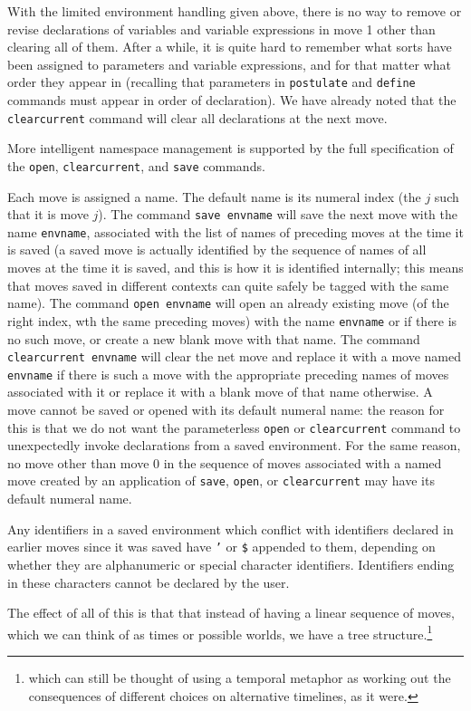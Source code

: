 \documentclass[12pt]{article}
\begin{document}
With the limited environment handling given above, there is no way to remove or revise declarations of variables and variable expressions in move 1 other than clearing all of them.  After a while, it is quite hard to remember what sorts have been assigned to parameters and variable expressions, and for that matter what order they appear in (recalling that parameters in {\tt postulate} and {\tt define} commands must appear in order of declaration).  We have already noted
that the {\tt clearcurrent} command will clear all declarations at the next move.

More intelligent namespace management is supported by the full specification of the {\tt open}, {\tt clearcurrent}, and {\tt save} commands.

Each move is assigned a name.  The default name is its numeral index (the $j$ such that it is move $j$).  The command {\tt save envname} will save the next move with the name
{\tt envname}, associated with the list of names of preceding moves at the time it is saved (a saved move is actually identified by the sequence of names of all moves at the time it is saved, and this is how it is identified internally;  this means that moves saved in different contexts can quite safely be tagged with the same name).  The command {\tt open envname} will open an already existing move (of the right index, wth the same preceding moves) with the name
{\tt envname} or if there is no such move, or create a new blank move with that name.  The command {\tt clearcurrent envname} will clear the net move and replace it with a move named {\tt envname} if there is such a move with the appropriate preceding names of moves associated with it or replace it with a blank move of that name otherwise.  A move cannot be saved or opened with its default numeral name:  the reason for this is that we do not want the
parameterless {\tt open} or {\tt clearcurrent} command to unexpectedly invoke declarations from a saved environment.  For the same reason, no move other than move 0 in the sequence of moves associated with a named move created by an application of {\tt save}, {\tt open}, or {\tt clearcurrent} may have its default numeral name.

Any identifiers in a saved environment which conflict with identifiers declared in earlier moves since it was saved have {\tt '} or {\tt \$} appended to them, depending on whether they are alphanumeric or special character identifiers.  Identifiers ending in these characters cannot be declared by the user.

The effect of all of this is that that instead of having a linear sequence of moves, which we can think of as times or possible worlds, we have a tree structure.\footnote{which can still be thought of using a temporal metaphor as working out the consequences of different choices on alternative timelines, as it were.}
\end{document}
